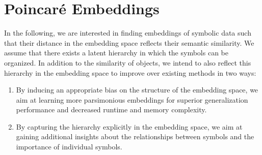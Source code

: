 \documentclass[11pt]{article}
\begin{document}
\section{Poincaré Embeddings}
\label{sec:poincare}
In the following, we are interested in finding embeddings of symbolic data such
that their distance in the embedding space reflects their semantic similarity.
We assume that there exists a latent hierarchy in which the symbols can be
organized. In addition to the similarity of objects, we intend to also reflect
this hierarchy in the embedding space to improve over existing methods in two
ways:
\begin{enumerate}
\item By inducing an appropriate bias on the structure of the embedding space, we
aim at learning more parsimonious embeddings for superior generalization
performance and decreased runtime and memory complexity.
\item By capturing the hierarchy explicitly in the embedding space, we aim at
gaining additional insights about the relationships between symbols and the
importance of individual symbols.
\end{enumerate}
\end{document}

